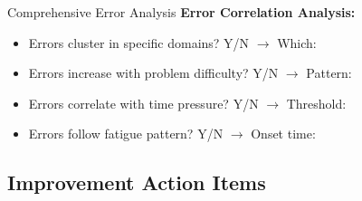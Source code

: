 \documentclass{article}
\begin{document}
\begin{analysisbox}{Comprehensive Error Analysis}
\textbf{Error Correlation Analysis:}
\begin{itemize}[nosep]
\item[$\square$] Errors cluster in specific domains? Y/N $\rightarrow$ Which: \underline{\hspace{3cm}}
\item[$\square$] Errors increase with problem difficulty? Y/N $\rightarrow$ Pattern: \underline{\hspace{2.5cm}}
\item[$\square$] Errors correlate with time pressure? Y/N $\rightarrow$ Threshold: \underline{\hspace{2.5cm}}
\item[$\square$] Errors follow fatigue pattern? Y/N $\rightarrow$ Onset time: \underline{\hspace{3cm}}
\end{itemize}
\end{analysisbox}

\subsection{Improvement Action Items}
\end{document}
